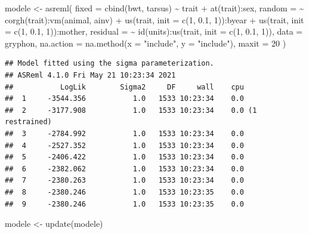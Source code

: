 \documentclass[
  12pt,
]{book}
\newenvironment{Shaded}{\begin{snugshade}}{\end{snugshade}}
\newcommand{\AttributeTok}[1]{\textcolor[rgb]{0.77,0.63,0.00}{#1}}
\newcommand{\DecValTok}[1]{\textcolor[rgb]{0.00,0.00,0.81}{#1}}
\newcommand{\FloatTok}[1]{\textcolor[rgb]{0.00,0.00,0.81}{#1}}
\newcommand{\FunctionTok}[1]{\textcolor[rgb]{0.00,0.00,0.00}{#1}}
\newcommand{\NormalTok}[1]{#1}
\newcommand{\OtherTok}[1]{\textcolor[rgb]{0.56,0.35,0.01}{#1}}
\newcommand{\SpecialCharTok}[1]{\textcolor[rgb]{0.00,0.00,0.00}{#1}}
\newcommand{\StringTok}[1]{\textcolor[rgb]{0.31,0.60,0.02}{#1}}
\begin{document}
\begin{Shaded}
\begin{Highlighting}[]
\NormalTok{modele }\OtherTok{\textless{}{-}} \FunctionTok{asreml}\NormalTok{(}
  \AttributeTok{fixed =} \FunctionTok{cbind}\NormalTok{(bwt, tarsus) }\SpecialCharTok{\textasciitilde{}}\NormalTok{ trait }\SpecialCharTok{+} \FunctionTok{at}\NormalTok{(trait)}\SpecialCharTok{:}\NormalTok{sex,}
  \AttributeTok{random =} \SpecialCharTok{\textasciitilde{}} \FunctionTok{corgh}\NormalTok{(trait)}\SpecialCharTok{:}\FunctionTok{vm}\NormalTok{(animal, ainv) }\SpecialCharTok{+}
    \FunctionTok{us}\NormalTok{(trait, }\AttributeTok{init =} \FunctionTok{c}\NormalTok{(}\DecValTok{1}\NormalTok{, }\FloatTok{0.1}\NormalTok{, }\DecValTok{1}\NormalTok{))}\SpecialCharTok{:}\NormalTok{byear }\SpecialCharTok{+}
    \FunctionTok{us}\NormalTok{(trait, }\AttributeTok{init =} \FunctionTok{c}\NormalTok{(}\DecValTok{1}\NormalTok{, }\FloatTok{0.1}\NormalTok{, }\DecValTok{1}\NormalTok{))}\SpecialCharTok{:}\NormalTok{mother,}
  \AttributeTok{residual =} \SpecialCharTok{\textasciitilde{}} \FunctionTok{id}\NormalTok{(units)}\SpecialCharTok{:}\FunctionTok{us}\NormalTok{(trait, }\AttributeTok{init =} \FunctionTok{c}\NormalTok{(}\DecValTok{1}\NormalTok{, }\FloatTok{0.1}\NormalTok{, }\DecValTok{1}\NormalTok{)),}
  \AttributeTok{data =}\NormalTok{ gryphon,}
  \AttributeTok{na.action =} \FunctionTok{na.method}\NormalTok{(}\AttributeTok{x =} \StringTok{"include"}\NormalTok{, }\AttributeTok{y =} \StringTok{"include"}\NormalTok{),}
  \AttributeTok{maxit =} \DecValTok{20}
\NormalTok{)}
\end{Highlighting}
\end{Shaded}

\begin{verbatim}
## Model fitted using the sigma parameterization.
## ASReml 4.1.0 Fri May 21 10:23:34 2021
##           LogLik        Sigma2     DF     wall    cpu
##  1     -3544.356           1.0   1533 10:23:34    0.0
##  2     -3177.908           1.0   1533 10:23:34    0.0 (1 restrained)
##  3     -2784.992           1.0   1533 10:23:34    0.0
##  4     -2527.352           1.0   1533 10:23:34    0.0
##  5     -2406.422           1.0   1533 10:23:34    0.0
##  6     -2382.062           1.0   1533 10:23:34    0.0
##  7     -2380.263           1.0   1533 10:23:34    0.0
##  8     -2380.246           1.0   1533 10:23:35    0.0
##  9     -2380.246           1.0   1533 10:23:35    0.0
\end{verbatim}

\begin{Shaded}
\begin{Highlighting}[]
\NormalTok{modele }\OtherTok{\textless{}{-}} \FunctionTok{update}\NormalTok{(modele)}
\end{Highlighting}
\end{Shaded}
\end{document}
